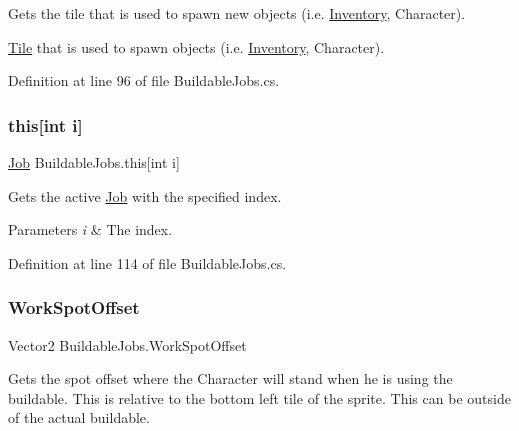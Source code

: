 Gets the tile that is used to spawn new objects (i.\+e. \hyperlink{class_inventory}{Inventory}, Character). 

\hyperlink{class_tile}{Tile} that is used to spawn objects (i.\+e. \hyperlink{class_inventory}{Inventory}, Character).

Definition at line 96 of file Buildable\+Jobs.\+cs.

\mbox{\label{class_buildable_jobs_ae00535b7e3944cb463dfa2df8d76c3c1}} 
\subsubsection{\texorpdfstring{this[int i]}{this[int i]}}
{\footnotesize\ttfamily \hyperlink{class_job}{Job} Buildable\+Jobs.\+this\mbox{[}int i\mbox{]}\hspace{0.3cm}{\ttfamily [get]}}



Gets the active \hyperlink{class_job}{Job} with the specified index. 


\begin{DoxyParams}{Parameters}
{\em i} & The index.\\
\hline
\end{DoxyParams}


Definition at line 114 of file Buildable\+Jobs.\+cs.

\mbox{\label{class_buildable_jobs_a65dd0d32fb03f04cf0fb38a484edd420}} 
\subsubsection{\texorpdfstring{Work\+Spot\+Offset}{WorkSpotOffset}}
{\footnotesize\ttfamily Vector2 Buildable\+Jobs.\+Work\+Spot\+Offset\hspace{0.3cm}{\ttfamily [get]}}



Gets the spot offset where the Character will stand when he is using the buildable. This is relative to the bottom left tile of the sprite. This can be outside of the actual buildable. 


